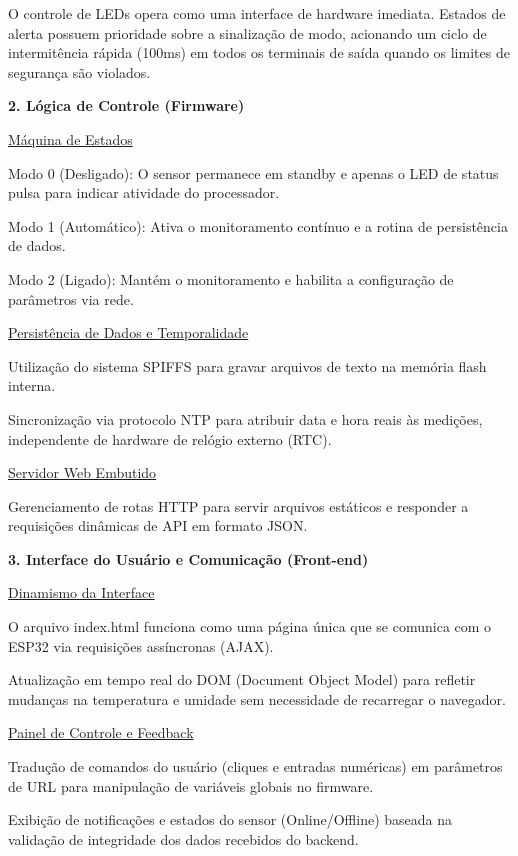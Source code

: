     O controle de LEDs opera como uma interface de hardware imediata. Estados de alerta possuem prioridade sobre a sinalização de modo, acionando um ciclo de intermitência rápida (100ms) em todos os terminais de saída quando os limites de segurança são violados.

\vspace{0.5cm}

\textbf{2. Lógica de Controle (Firmware)}

\underline{Máquina de Estados}

    Modo 0 (Desligado): O sensor permanece em standby e apenas o LED de status pulsa para indicar atividade do processador.

    Modo 1 (Automático): Ativa o monitoramento contínuo e a rotina de persistência de dados.

    Modo 2 (Ligado): Mantém o monitoramento e habilita a configuração de parâmetros via rede.

\underline{Persistência de Dados e Temporalidade}

    Utilização do sistema SPIFFS para gravar arquivos de texto na memória flash interna.

    Sincronização via protocolo NTP para atribuir data e hora reais às medições, independente de hardware de relógio externo (RTC).

\underline{Servidor Web Embutido}

    Gerenciamento de rotas HTTP para servir arquivos estáticos e responder a requisições dinâmicas de API em formato JSON.

\vspace{0.5cm}

\textbf{3. Interface do Usuário e Comunicação (Front-end)}

\underline{Dinamismo da Interface}

    O arquivo index.html funciona como uma página única que se comunica com o ESP32 via requisições assíncronas (AJAX).

    Atualização em tempo real do DOM (Document Object Model) para refletir mudanças na temperatura e umidade sem necessidade de recarregar o navegador.

\underline{Painel de Controle e Feedback}

    Tradução de comandos do usuário (cliques e entradas numéricas) em parâmetros de URL para manipulação de variáveis globais no firmware.

    Exibição de notificações e estados do sensor (Online/Offline) baseada na validação de integridade dos dados recebidos do backend.

